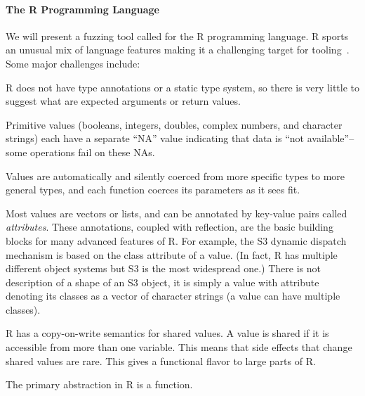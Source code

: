 \documentclass[sigplan,anonymous,review]{acmart}
\begin{document}
\paragraph{The R Programming Language}

We will present a fuzzing tool called \tool for the R programming language.
R sports an unusual mix of language features making it a challenging target for
tooling~\cite{morandat2012evaluating}. 
Some major challenges include:

\begin{compactitem}[$-$]

\item R does not have type annotations or a static type system, so there is very little to suggest what are expected arguments or return values.

\item Primitive values (booleans, integers, doubles, complex numbers, and character strings) each have a separate ``NA'' value indicating that data is ``not available''--some operations fail on these NAs.

\item Values are automatically and silently coerced from more specific types to more general types, and each function coerces its parameters as it sees fit.

\item Most values are vectors or lists, and can be annotated by key-value pairs called \textit{attributes}. 
These annotations, coupled with reflection, are the basic building blocks for many advanced features of R. 
For example, the S3 dynamic dispatch mechanism is based on the class attribute of a value.
(In fact, R has multiple different object systems but S3 is the most widespread one.)
There is not description of a shape of an S3 object, it is simply a value with  attribute denoting its classes as a vector of character strings (a value can have multiple classes).


\item R has a copy-on-write semantics for shared values. A value is shared if
    it is accessible from more than one variable. This means that side effects
    that change shared values are rare. This gives a functional flavor to large
    parts of R.

 \item The primary abstraction in R is a function.
\end{compactitem}
\end{document}
